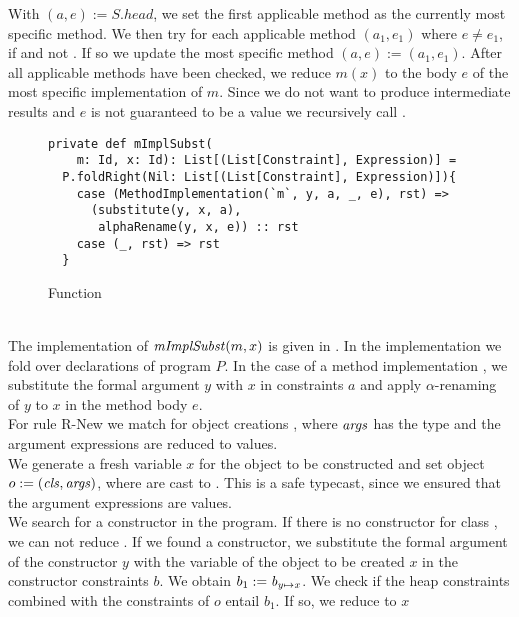 With $(a, e) := S.head$, we set the first applicable method
as the currently most specific method.
We then try for each applicable method $(a_1, e_1)$ where $e \not= e_1$,
if  and not .
If so we update the most specific method $(a, e) := (a_1, e_1)$.
After all applicable methods have been checked, we reduce
$m(x)$ to the body $e$ of the most specific implementation of $m$.
Since we do not want to produce intermediate results and $e$
is not guaranteed to be a value we recursively call .
%
\begin{figure}[h]
\begin{lstlisting}
private def mImplSubst(
    m: Id, x: Id): List[(List[Constraint], Expression)] =
  P.foldRight(Nil: List[(List[Constraint], Expression)]){
    case (MethodImplementation(`m`, y, a, _, e), rst) =>
      (substitute(y, x, a),
       alphaRename(y, x, e)) :: rst
    case (_, rst) => rst
  }
\end{lstlisting}
\caption{Function }
\label{fig:scala-mimpl}
\end{figure}\\
%
The implementation of $\mathit{mImplSubst}(m, x)$ is given in .
In the implementation we fold over declarations of program $P$.
In the case of a method implementation ,
we substitute the formal argument $y$ with $x$ in constraints $a$
and apply $\alpha$-renaming of $y$ to $x$ in the method body $e$.\\
%
For rule R-New we match for object creations ,
where $\mathit{args}$ has the type 
and the argument expressions are reduced to values.\\
We generate a fresh variable $x$ for the object to be constructed
and set object $o := (\mathit{cls}, \mathit{args})$, %
where  are cast to .
This is a safe typecast, since we ensured
that the argument expressions are values.\\
We search for a constructor  in the program.
If there is no constructor for class ,
we can not reduce .
If we found a constructor,
we substitute the formal argument of the constructor $y$
with the variable of the object to be created $x$
in the constructor constraints $b$.
We obtain $b_1 := \mathit{b}_{\mathit{y} \mapsto \mathit{x}}$.
We check if the heap constraints combined
with the constraints of $o$ entail $b_1$.
If so, we reduce  to $x$
